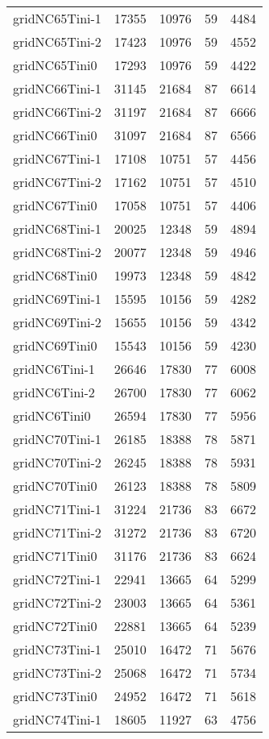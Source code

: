 \begin{longtable}{lrrrr}
gridNC65Tini-1 & 17355 & 10976 & 59 & 4484 \\
gridNC65Tini-2 & 17423 & 10976 & 59 & 4552 \\
gridNC65Tini0 & 17293 & 10976 & 59 & 4422 \\
gridNC66Tini-1 & 31145 & 21684 & 87 & 6614 \\
gridNC66Tini-2 & 31197 & 21684 & 87 & 6666 \\
gridNC66Tini0 & 31097 & 21684 & 87 & 6566 \\
gridNC67Tini-1 & 17108 & 10751 & 57 & 4456 \\
gridNC67Tini-2 & 17162 & 10751 & 57 & 4510 \\
gridNC67Tini0 & 17058 & 10751 & 57 & 4406 \\
gridNC68Tini-1 & 20025 & 12348 & 59 & 4894 \\
gridNC68Tini-2 & 20077 & 12348 & 59 & 4946 \\
gridNC68Tini0 & 19973 & 12348 & 59 & 4842 \\
gridNC69Tini-1 & 15595 & 10156 & 59 & 4282 \\
gridNC69Tini-2 & 15655 & 10156 & 59 & 4342 \\
gridNC69Tini0 & 15543 & 10156 & 59 & 4230 \\
gridNC6Tini-1 & 26646 & 17830 & 77 & 6008 \\
gridNC6Tini-2 & 26700 & 17830 & 77 & 6062 \\
gridNC6Tini0 & 26594 & 17830 & 77 & 5956 \\
gridNC70Tini-1 & 26185 & 18388 & 78 & 5871 \\
gridNC70Tini-2 & 26245 & 18388 & 78 & 5931 \\
gridNC70Tini0 & 26123 & 18388 & 78 & 5809 \\
gridNC71Tini-1 & 31224 & 21736 & 83 & 6672 \\
gridNC71Tini-2 & 31272 & 21736 & 83 & 6720 \\
gridNC71Tini0 & 31176 & 21736 & 83 & 6624 \\
gridNC72Tini-1 & 22941 & 13665 & 64 & 5299 \\
gridNC72Tini-2 & 23003 & 13665 & 64 & 5361 \\
gridNC72Tini0 & 22881 & 13665 & 64 & 5239 \\
gridNC73Tini-1 & 25010 & 16472 & 71 & 5676 \\
gridNC73Tini-2 & 25068 & 16472 & 71 & 5734 \\
gridNC73Tini0 & 24952 & 16472 & 71 & 5618 \\
gridNC74Tini-1 & 18605 & 11927 & 63 & 4756 \\

\end{longtable}
